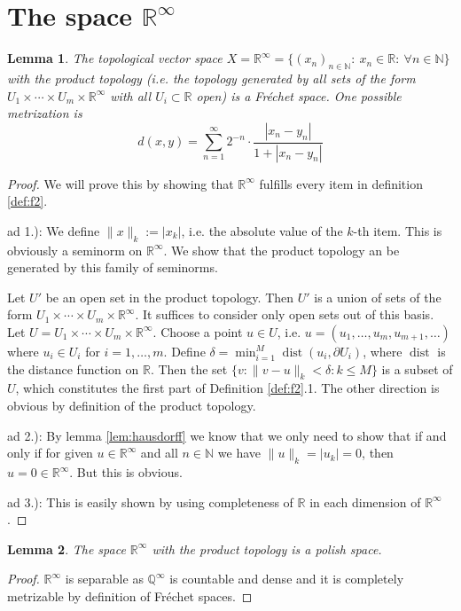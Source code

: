 \documentclass{scrartcl}
\newtheorem{lemma}{Lemma}
\theoremstyle{definition}
\theoremstyle{remark}
\newcommand{\Frechet}{Fr\'echet }
\newcommand{\N}{\mathbb N}
\newcommand{\R}{\mathbb R}
\newcommand{\Q}{\mathbb Q}
\newcommand{\del}{\partial}
\newcommand{\dist}{\operatorname{dist}}
\begin{document}
\section{The space $\R^\infty$}
\begin{lemma}\label{lem:RInfTop}
The topological vector space $X = \R^\infty = \{(x_n)_{n\in\N}: ~x_n\in\R:~\forall n\in\N \}$ with the product topology (i.e. the topology generated by all sets of the form $U_1\times\cdots\times U_m\times \R^\infty$ with all $U_i\subset \R $ open) is a \Frechet space. One possible metrization is
\begin{equation}
d(x, y) = \sum_{n=1}^{\infty}2^{-n}\cdot \frac{|x_n-y_n|}{1 + |x_n-y_n|}
\end{equation}
\end{lemma}
\begin{proof}
We will prove this by showing that $\R^\infty$ fulfills every item in definition \ref{def:f2}.

ad 1.): We define $\|x\|_k := |x_k|$, i.e. the absolute value of the $k$-th item. This is obviously a seminorm on $\R^\infty$. We show that the product topology an be generated by this family of seminorms. 

Let $U'$ be an open set in the product topology. Then $U'$ is a union of sets of the form $U_1\times\cdots\times U_m\times \R^\infty$. It suffices to consider only open sets out of this basis. Let $U = U_1\times\cdots\times U_m\times \R^\infty$. Choose a point $u\in U$, i.e. $u = (u_1, \ldots, u_m, u_{m+1},\ldots)$ where $u_i \in U_i$ for $i=1,\ldots, m$. Define $\delta = \min_{i=1}^M \dist(u_i, \del U_i)$, where $\dist$ is the distance function on $\R$. Then the set $\{v: \|v-u\|_k < \delta: k\leq M\} $ is a subset of $U$, which constitutes the first part of Definition \ref{def:f2}.1. The other direction is obvious by definition of the product topology.

ad 2.): By lemma \ref{lem:hausdorff} we know that we only need to show that if and only if for given $u\in\R^\infty$ and all $n\in \N$ we have $\|u\|_k = |u_k| = 0$, then $u=0\in\R^\infty$. But this is obvious.

ad 3.): This is easily shown by using completeness of $\R$ in each dimension of $\R^\infty$.
\end{proof}

\begin{lemma}
The space $\R^\infty$ with the product topology is a polish space.
\end{lemma}
\begin{proof}
$\R^\infty$ is separable as $\Q^\infty$ is countable and dense and it is completely metrizable by definition of \Frechet spaces.
\end{proof}
\end{document}
